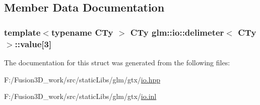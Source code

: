 \subsection{Member Data Documentation}
\hypertarget{structglm_1_1io_1_1delimeter_a9ade129dae50c4f716f724e7425f9c68}{}
\subsubsection[{value}]{\setlength{\rightskip}{0pt plus 5cm}template$<$typename C\+Ty $>$ C\+Ty {\bf glm\+::io\+::delimeter}$<$ C\+Ty $>$\+::value\mbox{[}3\mbox{]}}\label{structglm_1_1io_1_1delimeter_a9ade129dae50c4f716f724e7425f9c68}


The documentation for this struct was generated from the following files\+:\begin{DoxyCompactItemize}
\item 
F\+:/\+Fusion3\+D\+\_\+work/src/static\+Libs/glm/gtx/\hyperlink{io_8hpp}{io.\+hpp}\item 
F\+:/\+Fusion3\+D\+\_\+work/src/static\+Libs/glm/gtx/\hyperlink{io_8inl}{io.\+inl}\end{DoxyCompactItemize}
